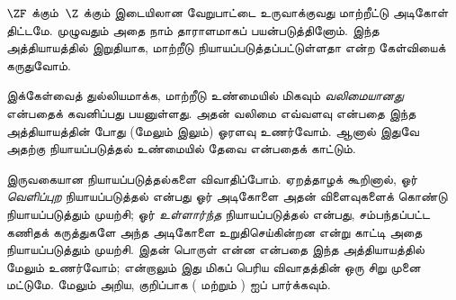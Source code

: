\documentclass[../../../include/open-logic-section]{subfiles}
\begin{document}

$\ZF$ க்கும்~$\Z$ க்கும் இடையிலான வேறுபாட்டை உருவாக்குவது மாற்றீட்டு
அடிகோள் திட்டமே.  முழுவதும்
அதை நாம் தாராளமாகப் பயன்படுத்தினோம். இந்த அத்தியாயத்தில் இறுதியாக,
மாற்றீடு நியாயப்படுத்தப்பட்டுள்ளதா என்ற கேள்வியைக் கருதுவோம்.

இக்கேள்வைத் துல்லியமாக்க, மாற்றீடு உண்மையில் மிகவும் \emph{வலிமையானது}
என்பதைக் கவனிப்பது பயனுள்ளது. அதன் வலிமை எவ்வளவு என்பதை இந்த அத்தியாயத்தின்
போது (மேலும்  இலும்) ஓரளவு
உணர்வோம். ஆனால் இதுவே அதற்கு நியாயப்படுத்தல் உண்மையில் தேவை என்பதைக்
காட்டும்.

இருவகையான நியாயப்படுத்தல்களை விவாதிப்போம். ஏறத்தாழக் கூறினால், ஓர்
\emph{வெளிப்புற} நியாயப்படுத்தல் என்பது ஓர் அடிகோளை அதன் விளைவுகளைக் கொண்டு
நியாயப்படுத்தும் முயற்சி; ஓர் \emph{உள்ளார்ந்த} நியாயப்படுத்தல் என்பது,
சம்பந்தப்பட்ட கணிதக் கருத்துகளே அந்த அடிகோளை உறுதிசெய்கின்றன என்று காட்டி
அதை நியாயப்படுத்தும் முயற்சி. இதன் பொருள் என்ன என்பதை இந்த அத்தியாயத்தில்
மேலும் உணர்வோம்; என்றாலும் இது மிகப் பெரிய விவாதத்தின் ஒரு சிறு முனை
மட்டுமே. மேலும் அறிய, குறிப்பாக \citeauthor{Maddy1988a}
(\citeyear{Maddy1988a} மற்றும் \citeyear{Maddy1988b}) ஐப் பார்க்கவும்.
\end{document}
